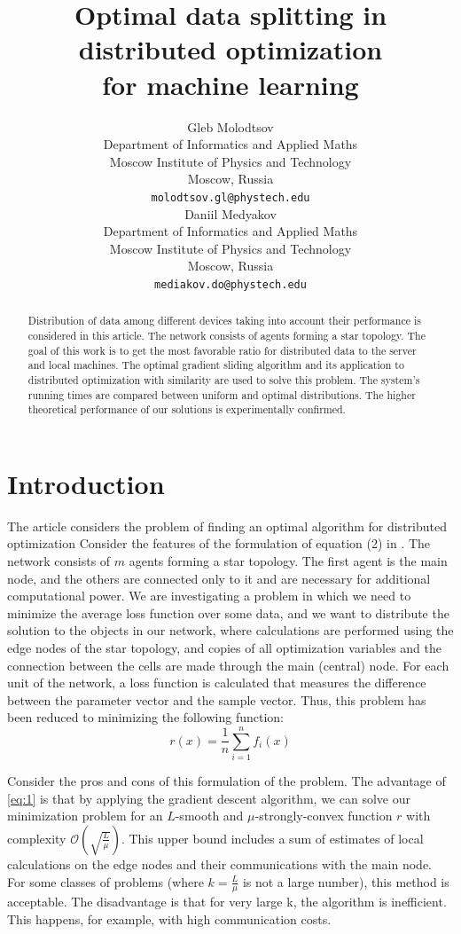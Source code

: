\documentclass{article}
\title{Optimal data splitting in distributed optimization \\for machine learning}
\author{Gleb Molodtsov
    \\
	Department of Informatics and Applied Maths \\
	Moscow Institute of Physics and Technology\\
	Moscow, Russia\\
	\texttt{molodtsov.gl@phystech.edu} \\
	\And
	Daniil Medyakov \\
	Department of Informatics and Applied Maths \\
	Moscow Institute of Physics and Technology\\
	Moscow, Russia \\
	\texttt{mediakov.do@phystech.edu} \\
}
\date{}
\begin{document}
\maketitle

\begin{abstract}
Distribution of data among different devices taking into account their performance is considered in this article. The network consists of agents forming a star topology. The goal of this work is to get the most favorable ratio for distributed data to the server and local machines. The optimal gradient sliding algorithm and its application to distributed optimization with similarity are used to solve this problem. The system's running times are compared between uniform and optimal distributions. The higher theoretical performance of our solutions is experimentally confirmed. 
\end{abstract}




\section{Introduction}
The article \citep{kovalev2022optimal} considers the problem of finding an optimal algorithm for distributed optimization
Consider the features of the formulation of equation (2) in \citep{kovalev2022optimal}. The network consists of $m$ agents forming a star topology. The first agent is the main node, and the others are connected only to it and are necessary for additional computational power. We are investigating a problem in which we need to minimize the average loss function over some data, and we want to distribute the solution to the objects in our network, where calculations are performed using the edge nodes of the star topology, and copies of all optimization variables and the connection between the cells are made through the main (central) node. For each unit of the network, a loss function is calculated that measures the difference between the parameter vector and the sample vector. Thus, this problem has been reduced to minimizing the following function:
\\
\begin{equation}
    \label{eq:1}
    r(x) = \frac{1}{n} \sum \limits_{i = 1}^{n} f _i(x)
\end{equation}

Consider the pros and cons of this formulation of the problem.
The advantage of \ref{eq:1} is that by applying the gradient descent algorithm, we can solve our minimization problem for an $L$-smooth and $\mu$-strongly-convex function $r$ with complexity $\mathcal{O}(\sqrt{\frac{L}{\mu}})$. This upper bound includes a sum of estimates of local calculations on the edge nodes and their communications with the main node. For some classes of problems (where $k = \frac{L}{\mu}$ is not a large number), this method is acceptable. The disadvantage is that for very large k, the algorithm is inefficient. This happens, for example, with high communication costs.
\end{document}
